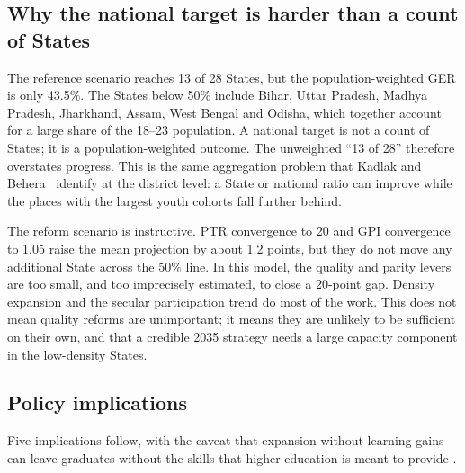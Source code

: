 \subsection{Why the national target is harder than a count of States}

The reference scenario reaches 13 of 28 States, but the population-weighted GER is only 43.5\%. The States below 50\% include Bihar, Uttar Pradesh, Madhya Pradesh, Jharkhand, Assam, West Bengal and Odisha, which together account for a large share of the 18--23 population. A national target is not a count of States; it is a population-weighted outcome. The unweighted ``13 of 28'' therefore overstates progress. This is the same aggregation problem that Kadlak and Behera~\cite{kadlak2026} identify at the district level: a State or national ratio can improve while the places with the largest youth cohorts fall further behind.

The reform scenario is instructive. PTR convergence to 20 and GPI convergence to 1.05 raise the mean projection by about 1.2 points, but they do not move any additional State across the 50\% line. In this model, the quality and parity levers are too small, and too imprecisely estimated, to close a 20-point gap. Density expansion and the secular participation trend do most of the work. This does not mean quality reforms are unimportant; it means they are unlikely to be sufficient on their own, and that a credible 2035 strategy needs a large capacity component in the low-density States.

\subsection{Policy implications}

Five implications follow, with the caveat that expansion without learning gains can leave graduates without the skills that higher education is meant to provide \cite{unesco2020}.

